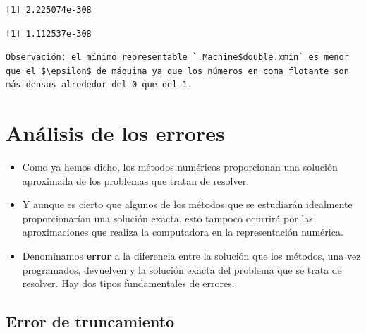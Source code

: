 \documentclass[openany]{book}
\newenvironment{Shaded}{\begin{snugshade}}{\end{snugshade}}
\newcommand{\CommentTok}[1]{\textcolor[rgb]{0.56,0.35,0.01}{\textit{#1}}}
\newcommand{\DecValTok}[1]{\textcolor[rgb]{0.00,0.00,0.81}{#1}}
\newcommand{\NormalTok}[1]{#1}
\newcommand{\OperatorTok}[1]{\textcolor[rgb]{0.81,0.36,0.00}{\textbf{#1}}}
\newcommand{\StringTok}[1]{\textcolor[rgb]{0.31,0.60,0.02}{#1}}
\providecommand{\tightlist}{%
  \setlength{\itemsep}{0pt}\setlength{\parskip}{0pt}}
\begin{document}
\begin{verbatim}
[1] 2.225074e-308
\end{verbatim}

\begin{Shaded}
\end{Shaded}

\begin{verbatim}
[1] 1.112537e-308
\end{verbatim}

\begin{verbatim}
Observación: el mínimo representable `.Machine$double.xmin` es menor que el $\epsilon$ de máquina ya que los números en coma flotante son más densos alrededor del 0 que del 1.
\end{verbatim}

\hypertarget{anuxe1lisis-de-los-errores}{%
\section{Análisis de los errores}\label{anuxe1lisis-de-los-errores}}

\begin{itemize}
\tightlist
\item
  Como ya hemos dicho, los métodos numéricos proporcionan una solución aproximada de los problemas que tratan de resolver.
\item
  Y aunque es cierto que algunos de los métodos que se estudiarán idealmente proporcionarían una solución exacta, esto tampoco ocurrirá por las aproximaciones que realiza la computadora en la representación numérica.
\item
  Denominamos \textbf{error} a la diferencia entre la solución que los métodos, una vez programados, devuelven y la solución exacta del problema que se trata de resolver. Hay dos tipos fundamentales de errores.
\end{itemize}

\hypertarget{error-de-truncamiento}{%
\subsection{Error de truncamiento}\label{error-de-truncamiento}}
\end{document}
